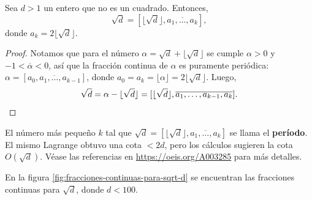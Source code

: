 \begin{corolario}
  Sea $d > 1$ un entero que no es un cuadrado. Entonces,
  $$\sqrt{d} = [\lfloor\sqrt{d}\rfloor, \overline{a_1,\ldots,a_k}],$$
  donde $a_k = 2\lfloor\sqrt{d}\rfloor$.

  \begin{proof}
    Notamos que para el número $\alpha = \sqrt{d} + \lfloor\sqrt{d}\rfloor$
    se cumple $\alpha > 0$ y $-1 < \overline{\alpha} < 0$, así que la fracción
    continua de $\alpha$ es puramente periódica:
    $\alpha = [\overline{a_0,a_1,\ldots,a_{k-1}}]$,
    donde $a_0 = a_k = \lfloor\alpha\rfloor = 2\lfloor\sqrt{d}\rfloor$. Luego,
    \[ \sqrt{d} = \alpha - \lfloor\sqrt{d}\rfloor =
       [\lfloor\sqrt{d}\rfloor, \overline{a_1,\ldots,a_{k-1},a_k}]. \qedhere \]
  \end{proof}
\end{corolario}

\begin{comentario}
  El número más pequeño $k$ tal que
  $\sqrt{d} = [\lfloor\sqrt{d}\rfloor, \overline{a_1,\ldots,a_k}]$ se llama el
  \textbf{período}. El mismo Lagrange obtuvo una cota $< 2d$, pero los cálculos
  sugieren la cota $O (\sqrt{d})$. Véase las referencias en
  \url{https://oeis.org/A003285} para más detalles.
\end{comentario}

En la figura \ref{fig:fracciones-continuas-para-sqrt-d} se encuentran las
fracciones continuas para $\sqrt{d}$, donde $d < 100$.

